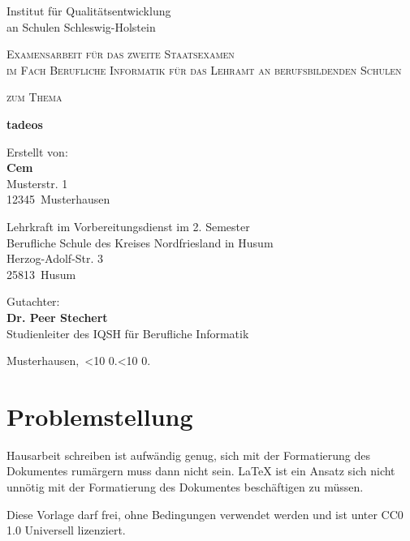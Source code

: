 \documentclass[a4paper, 12pt]{article}
\title{\haThema}
\author{\haAutor}
\date{\today}
\newcommand{\leadingzero}[1]{\ifnum #1<10 0\the#1\else\the#1\fi}
\newcommand{\datumVonHeute}{\leadingzero{\day}.\leadingzero{\month}.\the\year}
\newcommand{\haThema}{tadeos}
\newcommand{\haAutor}{Cem}
\newcommand{\haAutorAdresse}{Musterstr. 1}
\newcommand{\haAutorPLZ}{12345}
\newcommand{\haAutorOrt}{Musterhausen}
\newcommand{\haDeckblattTextEins}{Examensarbeit für das zweite Staatsexamen\\ im Fach Berufliche Informatik für das Lehramt an berufsbildenden Schulen}
\newcommand{\haDeckblattTextZwei}{Lehrkraft im Vorbereitungsdienst im 2. Semester}
\newcommand{\haSchule}{Berufliche Schule des Kreises Nordfriesland in Husum}
\newcommand{\haSchuleAdresse}{Herzog-Adolf-Str. 3}
\newcommand{\haSchulePLZ}{25813}
\newcommand{\haSchuleOrt}{Husum}
\newcommand{\haGutachter}{Dr. Peer Stechert}
\newcommand{\haGutachterText}{Studienleiter des IQSH für Berufliche Informatik}
\begin{document}
\begin{titlepage}
Institut für Qualitätsentwicklung\\
an Schulen Schleswig-Holstein
\begin{center}
\vspace{1.5cm}
{\scshape\large \haDeckblattTextEins \par}
\vspace{1cm}
{\scshape\large zum Thema\par}
\vspace{1.5cm}
{\LARGE\bfseries \haThema \par}
\vfill
{Erstellt von:\\ {\bfseries \haAutor}\\ \haAutorAdresse\\ \haAutorPLZ~\haAutorOrt \par}
\vspace{1cm}
{\haDeckblattTextZwei \\ \haSchule \\ \haSchuleAdresse \\ \haSchulePLZ~\haSchuleOrt \par}
\vspace{1cm}
Gutachter:\\ {\bfseries \haGutachter}\\ \haGutachterText
\vfill
\end{center}
{\haAutorOrt,~\datumVonHeute\par}
\end{titlepage}
\thispagestyle{empty}
\newpage

\tableofcontents
\thispagestyle{empty}
\newpage

\setcounter{page}{1}



\section{Problemstellung}

Hausarbeit schreiben ist aufwändig genug, sich mit der Formatierung des Dokumentes rumärgern muss dann nicht sein. \LaTeX{} ist ein Ansatz sich nicht unnötig mit der Formatierung des Dokumentes beschäftigen zu müssen.

Diese Vorlage darf frei, ohne Bedingungen verwendet werden und ist unter CC0 1.0 Universell lizenziert.
\end{document}
